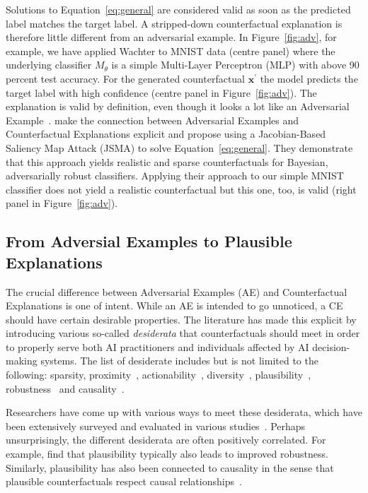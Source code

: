 \documentclass{article}
\begin{document}
Solutions to Equation~\ref{eq:general} are considered valid as soon as the predicted label matches the target label. A stripped-down counterfactual explanation is therefore little different from an adversarial example. In Figure~\ref{fig:adv}, for example, we have applied Wachter to MNIST data (centre panel) where the underlying classifier $M_{\theta}$ is a simple Multi-Layer Perceptron (MLP) with above 90 percent test accuracy. For the generated counterfactual $\mathbf{x}^{\prime}$ the model predicts the target label with high confidence (centre panel in Figure~\ref{fig:adv}). The explanation is valid by definition, even though it looks a lot like an Adversarial Example~\citep{goodfellow2014explaining}. \citet{schut2021generating} make the connection between Adversarial Examples and Counterfactual Explanations explicit and propose using a Jacobian-Based Saliency Map Attack (JSMA) to solve Equation~\ref{eq:general}. They demonstrate that this approach yields realistic and sparse counterfactuals for Bayesian, adversarially robust classifiers. Applying their approach to our simple MNIST classifier does not yield a realistic counterfactual but this one, too, is valid (right panel in Figure~\ref{fig:adv}). 

\subsection{From Adversial Examples to Plausible Explanations}

The crucial difference between Adversarial Examples (AE) and Counterfactual Explanations is one of intent. While an AE is intended to go unnoticed, a CE should have certain desirable properties. The literature has made this explicit by introducing various so-called \textit{desiderata} that counterfactuals should meet in order to properly serve both AI practitioners and individuals affected by AI decision-making systems. The list of desiderate includes but is not limited to the following: sparsity, proximity~\citep{wachter2017counterfactual}, actionability~\citep{ustun2019actionable}, diversity~\citep{mothilal2020explaining}, plausibility~\citep{joshi2019realistic,poyiadzi2020face,schut2021generating}, robustness~\citep{upadhyay2021robust,pawelczyk2022probabilistically,altmeyer2023endogenous} and causality~\citep{karimi2021algorithmic}.

Researchers have come up with various ways to meet these desiderata, which have been extensively surveyed and evaluated in various studies~\citep{verma2020counterfactual,karimi2020survey,pawelczyk2021carla,artelt2021evaluating,guidotti2022counterfactual}. Perhaps unsurprisingly, the different desiderata are often positively correlated. For example, \citet{artelt2021evaluating} find that plausibility typically also leads to improved robustness. Similarly, plausibility has also been connected to causality in the sense that plausible counterfactuals respect causal relationships~\citep{mahajan2020preserving}. 
\end{document}

